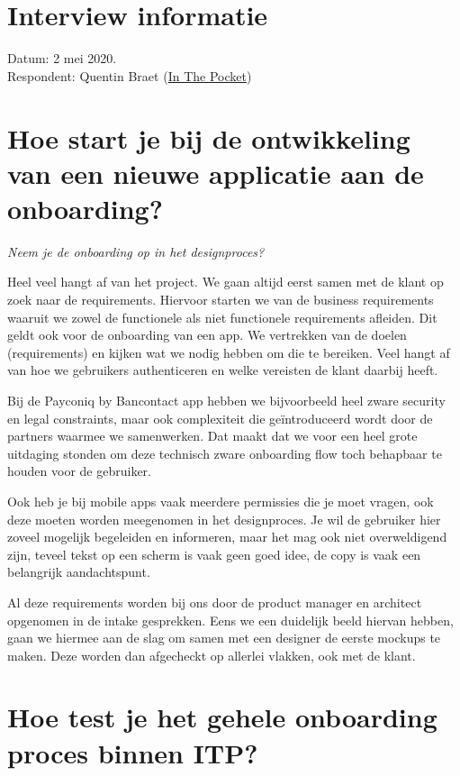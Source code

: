 \section{Interview informatie}

Datum: 2 mei 2020. \\
Respondent: Quentin Braet (\href{https://www.inthepocket.com/}{In The Pocket})

\section[Vraag 1]{Hoe start je bij de ontwikkeling van een nieuwe applicatie aan de onboarding?}

\textit{Neem je de onboarding op in het designproces?}

Heel veel hangt af van het project. We gaan altijd eerst samen met de klant op zoek naar de requirements. Hiervoor starten we van de business requirements waaruit we zowel de  functionele als niet functionele requirements afleiden. Dit geldt ook voor de onboarding van een app. We vertrekken van de doelen (requirements) en kijken wat we nodig hebben om die te bereiken. Veel hangt af van hoe we gebruikers authenticeren en welke vereisten de klant daarbij heeft.

Bij de Payconiq by Bancontact app hebben we bijvoorbeeld heel zware security en legal constraints, maar ook complexiteit die geïntroduceerd wordt door de partners waarmee we samenwerken. Dat maakt dat we voor een heel grote uitdaging stonden om deze technisch zware onboarding flow toch behapbaar te houden voor de gebruiker.

Ook heb je bij mobile apps vaak meerdere permissies die je moet vragen, ook deze moeten worden meegenomen in het designproces. Je wil de gebruiker hier zoveel mogelijk begeleiden en informeren, maar het mag ook niet overweldigend zijn, teveel tekst op een scherm is vaak geen goed idee, de copy is vaak een belangrijk aandachtspunt.

Al deze requirements worden bij ons door de product manager en architect opgenomen in de intake gesprekken. Eens we een duidelijk beeld hiervan hebben, gaan we hiermee aan de slag om samen met een designer de eerste mockups te maken. Deze worden dan afgecheckt op allerlei vlakken, ook met de klant.

\section[Vraag 2]{Hoe test je het gehele onboarding proces binnen ITP?}

